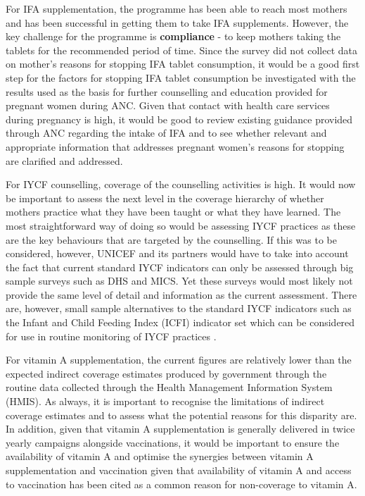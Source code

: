 \documentclass[12pt,a4paper]{article}
\begin{document}
For IFA supplementation, the programme has been able to reach most mothers and has been successful in getting them to take IFA supplements. However, the key challenge for the programme is \textbf{compliance} - to keep mothers taking the tablets for the recommended period of time. Since the survey did not collect data on mother's reasons for stopping IFA tablet consumption, it would be a good first step for the factors for stopping IFA tablet consumption be investigated with the results used as the basis for further counselling and education provided for pregnant women during ANC. Given that contact with health care services during pregnancy is high, it would be good to review existing guidance provided through ANC regarding the intake of IFA and to see whether relevant and appropriate information that addresses pregnant women's reasons for stopping are clarified and addressed.

For IYCF counselling, coverage of the counselling activities is high. It would now be important to assess the next level in the coverage hierarchy of whether mothers practice what they have been taught or what they have learned. The most straightforward way of doing so would be assessing IYCF practices as these are the key behaviours that are targeted by the counselling. If this was to be considered, however, UNICEF and its partners would have to take into account the fact that current standard IYCF indicators can only be assessed through big sample surveys such as DHS and MICS. Yet these surveys would most likely not provide the same level of detail and information as the current assessment. There are, however, small sample alternatives to the standard IYCF indicators such as the Infant and Child Feeding Index (ICFI) indicator set which can be considered for use in routine monitoring of IYCF practices \citep{Guevarra:2016uw}.

For vitamin A supplementation, the current figures are relatively lower than the expected indirect coverage estimates produced by government through the routine data collected through the Health Management Information System (HMIS). As always, it is important to recognise the limitations of indirect coverage estimates and to assess what the potential reasons for this disparity are. In addition, given that vitamin A supplementation is generally delivered in twice yearly campaigns alongside vaccinations, it would be important to ensure the availability of vitamin A and optimise the synergies between vitamin A supplementation and vaccination given that availability of vitamin A and access to vaccination has been cited as a common reason for non-coverage to vitamin A.
\end{document}
